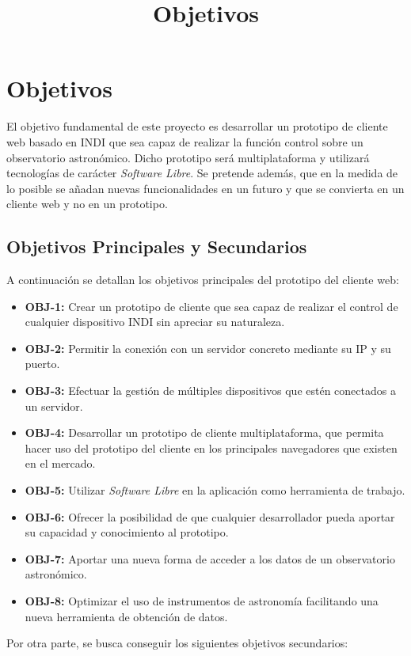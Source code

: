 \chapter{Objetivos}
\title{Objetivos}
\label{cap:Objetivos}

El objetivo fundamental de este proyecto es desarrollar un prototipo de cliente web basado en INDI que sea capaz de realizar la función control sobre un observatorio astronómico. Dicho prototipo será multiplataforma y utilizará tecnologías de carácter \textit{Software Libre}. Se pretende además, que en la medida de lo posible se añadan nuevas funcionalidades en un futuro y que se convierta en un cliente web y no en un prototipo.


\section{Objetivos Principales y Secundarios}
A continuación se detallan los objetivos principales del prototipo del cliente web:

\begin{itemize}
  \item \textbf{OBJ-1:} Crear un prototipo de cliente que sea capaz de realizar el control de cualquier dispositivo INDI sin apreciar su naturaleza.
  \item \textbf{OBJ-2:} Permitir la conexión con un servidor concreto mediante su IP y su puerto.
  \item \textbf{OBJ-3:} Efectuar la gestión de múltiples dispositivos que estén conectados a un servidor.
  \item \textbf{OBJ-4:} Desarrollar un prototipo de cliente multiplataforma, que permita hacer uso del prototipo del cliente en los principales navegadores que existen en el mercado.
  \item \textbf{OBJ-5:} Utilizar \textit{Software Libre} en la aplicación como herramienta de trabajo.
  \item \textbf{OBJ-6:} Ofrecer la posibilidad de que cualquier desarrollador pueda aportar su capacidad y conocimiento al prototipo.
  \item \textbf{OBJ-7:} Aportar una nueva forma de acceder a los datos de un observatorio astronómico.
  \item \textbf{OBJ-8:} Optimizar el uso de instrumentos de astronomía facilitando una nueva herramienta de obtención de datos.
\end{itemize}

Por otra parte, se busca conseguir los siguientes objetivos secundarios:

